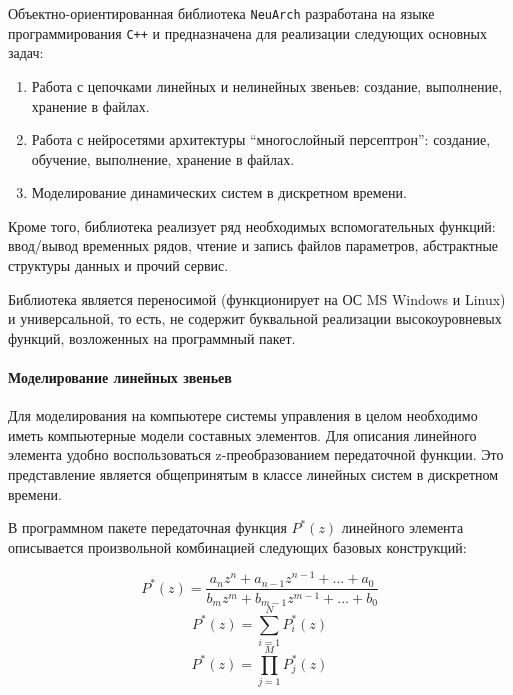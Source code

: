 Объектно-ориентированная библиотека {\tt NeuArch} разработана на языке
программирования {\tt C++} и предназначена для реализации следующих
основных задач:
\begin{enumerate}
\item Работа с цепочками линейных и нелинейных звеньев: создание,
  выполнение, хранение в файлах.
\item Работа с нейросетями архитектуры ``многослойный персептрон'':
  создание, обучение, выполнение, хранение в файлах.
\item Моделирование динамических систем в дискретном времени.
\end{enumerate}

Кроме того, библиотека реализует ряд необходимых вспомогательных
функций: ввод/вывод временных рядов, чтение и запись файлов
параметров, абстрактные структуры данных и прочий сервис.

Библиотека является переносимой (функционирует на ОС MS Windows и
Linux) и универсальной, то есть, не содержит буквальной реализации
высокоуровневых функций, возложенных на программный пакет.

\paragraph{Моделирование линейных звеньев}

Для моделирования на компьютере системы управления в целом необходимо
иметь компьютерные модели составных элементов.  Для описания линейного
элемента удобно воспользоваться z-преобразованием передаточной
функции.  Это представление является общепринятым в классе линейных
систем в дискретном времени.

В программном пакете передаточная функция $P^*(z)$ линейного элемента
описывается произвольной комбинацией следующих базовых конструкций:

\begin{equation}\label{eq:polyfrac}
P^*(z)=\frac{a_nz^n+a_{n-1}z^{n-1}+...+a_0}{b_mz^m+b_{m-1}z^{m-1}+...+b_0}
\end{equation}
\begin{equation}\label{eq:sum}
P^*(z)=\sum\limits_{i=1}^NP^*_i(z)
\end{equation}
\begin{equation}\label{eq:product}
P^*(z)=\prod\limits_{j=1}^MP^*_j(z)
\end{equation}

